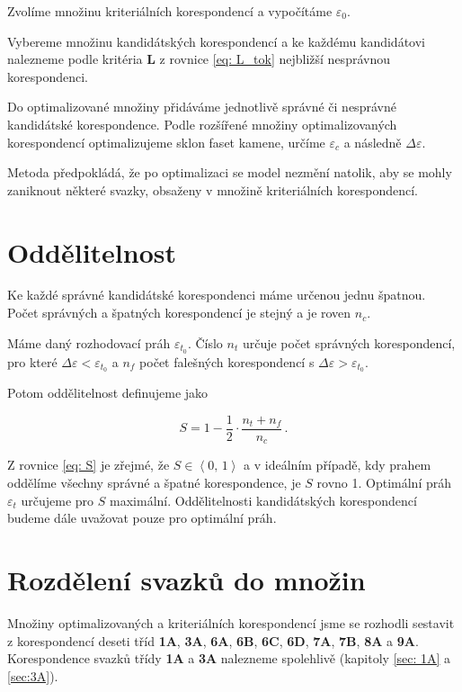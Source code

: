 	Zvolíme množinu kriteriálních korespondencí a vypočítáme $\varepsilon_0$. 
	
	Vybereme množinu kandidátských korespondencí a ke každému kandidátovi nalezneme podle kritéria $\mathbf{L}$ z rovnice  \ref{eq: L_tok} nejbližší nesprávnou korespondenci. 
	
	Do optimalizované množiny přidáváme jednotlivě správné či nesprávné kandidátské korespondence. Podle rozšířené množiny optimalizovaných korespondencí optimalizujeme sklon faset kamene, určíme $\varepsilon_c$ a následně $\Delta\varepsilon$.   	
	
	Metoda předpokládá, že po optimalizaci se model nezmění natolik, aby se mohly zaniknout některé svazky, obsaženy v  množině kriteriálních korespondencí. 		

\section{Oddělitelnost}
	Ke každé správné kandidátské korespondenci máme určenou jednu špatnou. Počet správných a špatných korespondencí je stejný a je roven $n_c$. 

	Máme daný rozhodovací práh $\varepsilon_{t_0}$.	Číslo $n_t$ určuje počet správných korespondencí, pro které $\Delta\varepsilon  < \varepsilon_{t_0}$ a $n_f$ počet falešných korespondencí s $\Delta\varepsilon  > \varepsilon_{t_0}$. 
	
	Potom oddělitelnost definujeme jako 
	
	\begin{equation}
		S = 1 - \frac{1}{2} \cdot \frac{n_t+n_f}{n_c}\,. 
	\label{eq: S}
	\end{equation}
	
	Z rovnice \ref{eq: S} je zřejmé, že $S \in \left\langle0,\,1 \right\rangle$ a v ideálním případě, kdy prahem oddělíme všechny správné a špatné korespondence, je $S$ rovno 1. Optimální práh $\varepsilon_{t}$ určujeme pro $S$ maximální. Oddělitelnosti kandidátských korespondencí budeme dále uvažovat pouze pro optimální práh. 
	
	 
\section{Rozdělení svazků do množin}

Množiny optimalizovaných a kriteriálních korespondencí jsme se rozhodli sestavit z korespondencí deseti tříd \textbf{1A}, \textbf{3A}, \textbf{6A}, \textbf{6B}, \textbf{6C}, \textbf{6D}, \textbf{7A}, \textbf{7B}, \textbf{8A} a \textbf{9A}. Korespondence svazků třídy \textbf{1A} a \textbf{3A} nalezneme spolehlivě (kapitoly \ref{sec: 1A} a \ref{sec:3A}). 

